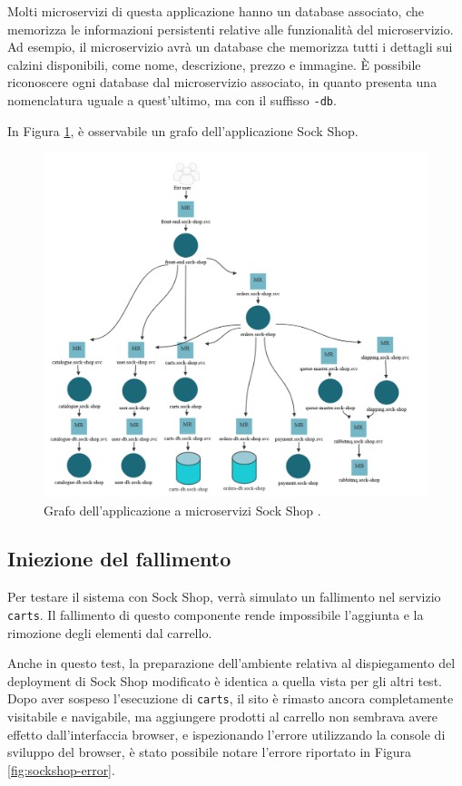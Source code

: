Molti microservizi di questa applicazione hanno un database associato, che memorizza le informazioni persistenti relative alle funzionalità del microservizio. Ad esempio, il microservizio  avrà un database che memorizza tutti i dettagli sui calzini disponibili, come nome, descrizione, prezzo e immagine. È possibile riconoscere ogni database dal microservizio associato, in quanto presenta una nomenclatura uguale a quest'ultimo, ma con il suffisso \texttt{-db}.

In Figura \ref{fig:sockshop-graph}, è osservabile un grafo dell'applicazione Sock Shop.

\begin{figure}[h]
    \centering
    \includegraphics[width=\textwidth]{immagini/capitolo5/sockshop_graph.png}
    \caption{Grafo dell'applicazione a microservizi Sock Shop \cite{sockshop_graph}.}
    \label{fig:sockshop-graph}
\end{figure}

\subsection{Iniezione del fallimento}
Per testare il sistema con Sock Shop, verrà simulato un fallimento nel servizio \texttt{carts}. Il fallimento di questo componente rende impossibile l'aggiunta e la rimozione degli elementi dal carrello.

Anche in questo test, la preparazione dell'ambiente relativa al dispiegamento del deployment di Sock Shop modificato è identica a quella vista per gli altri test. Dopo aver sospeso l'esecuzione di \texttt{carts}, il sito è rimasto ancora completamente visitabile e navigabile, ma aggiungere prodotti al carrello non sembrava avere effetto dall'interfaccia browser, e ispezionando l'errore utilizzando la console di sviluppo del browser, è stato possibile notare l'errore riportato in Figura \ref{fig:sockshop-error}.

